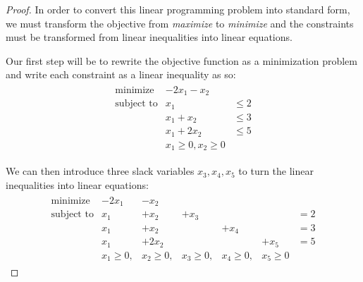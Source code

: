 \documentclass[12pt]{article}
\theoremstyle{definition}
\begin{document}
\begin{proof}
  In order to convert this linear programming problem into standard form, we
  must transform the objective from \textit{maximize} to \textit{minimize} and
  the constraints must be transformed from linear inequalities into linear equations.

  Our first step will be to rewrite the objective function as a minimization problem
  and write each constraint as a linear inequality as so:
  \begin{align*}
    \begin{array}{rll}
      \text{minimize} & -2x_1 - x_2 &\\
      \text{subject to} & x_1 &\leq 2 \\
      & x_1 + x_2 &\leq 3 \\
      & x_1 + 2x_2 &\leq 5 \\
      & x_1 \geq 0, x_2 \geq 0 &
    \end{array}
  \end{align*}

  We can then introduce three slack variables $x_3, x_4, x_5$ to turn the linear
  inequalities into linear equations:
  \begin{align*}
    \begin{array}{rllllll}
      \text{minimize} & -2x_1 &- x_2  & & & &\\
      \text{subject to} & x_1 &+ x_2 &+ x_3 & & &= 2 \\
      & x_1 &+ x_2 & &+ x_4 & &= 3 \\
      & x_1 &+ 2x_2 & & &+ x_5&= 5 \\
      & x_1 \geq 0, &x_2 \geq 0, &x_3 \geq 0, &x_4 \geq 0, &x_5 \geq 0
    \end{array}
  \end{align*}


\end{proof}
\end{document}
